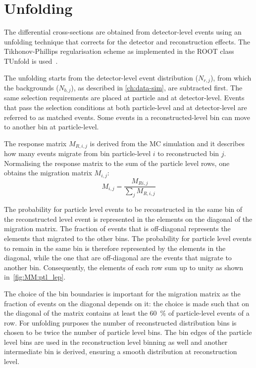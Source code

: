 \section{Unfolding}%
\label{ch:unfolding}

The differential cross-sections are obtained from detector-level events using an unfolding technique that corrects for the detector and reconstruction effects. The Tikhonov-Phillips regularisation scheme as implemented in the ROOT class TUnfold is used~\cite{Schmitt:2012kp}.

The unfolding starts from the detector-level event distribution (\(N_{r,j}\)), from which the backgrounds (\(N_{b,j}\)), as described in \cref{ch:data-sim}, are subtracted first. The same selection requirements are placed at particle and at detector-level. Events that pass the selection conditions at both particle-level and at detector-level are referred to as matched events. Some events in a reconstructed-level bin can move to another bin at particle-level.

The response matrix \(M_{R,i,j}\) is derived from the MC simulation and it describes how many events migrate from bin particle-level \( i\) to reconstructed bin \(j\).
Normalising the response matrix to the sum of the particle level rows, one obtains the migration matrix \(M_{i,j}\):
\begin{equation}\label{eq:mm}
    M_{i,j} = \frac{M_{Ri,j}}{\sum_j{M_{R,i,j}}}
\end{equation}

The probability for particle level events to be reconstructed in the same bin of the reconstructed level event is represented in the elements on the diagonal of the migration matrix. The fraction of events that is off-diagonal represents the elements that migrated to the other bins. The probability for particle level events to remain in the same bin is therefore represented by the elements in the diagonal, while the one that are off-diagonal are the events that migrate to another bin. Consequently, the elements of each row sum up to unity as shown in~\cref{fig:MM:ptl_lep}.

The choice of the bin boundaries is important for the migration matrix as the fraction of events on the diagonal depends on it: the choice is made such that on the diagonal of the matrix contains at least the \qty{60}{\%} of particle-level events of a row. For unfolding purposes the number of reconstructed distribution bins is chosen to be twice the number of particle level bins. The bin edges of the particle level bins are used in the reconstruction level binning as well and another intermediate bin is derived, ensuring a smooth distribution at reconstruction level.

